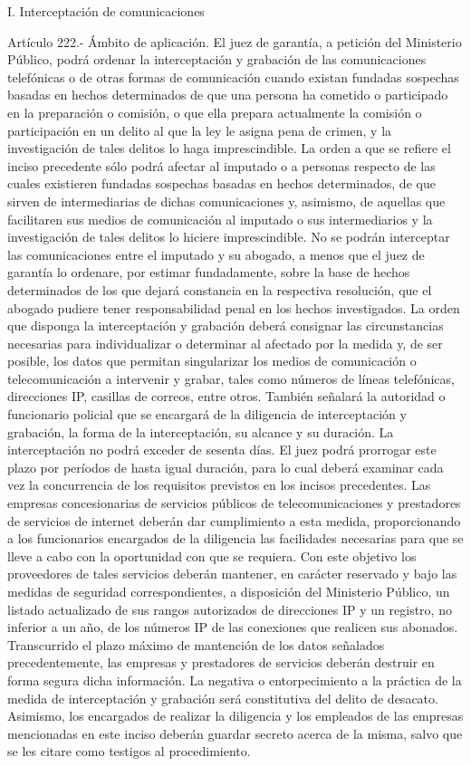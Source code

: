     I. Interceptación de comunicaciones


    Artículo 222.- Ámbito de aplicación. El juez de garantía, a petición del Ministerio Público, podrá ordenar la interceptación y grabación de las comunicaciones telefónicas o de otras formas de comunicación cuando existan fundadas sospechas basadas en hechos determinados de que una persona ha cometido o participado en la preparación o comisión, o que ella prepara actualmente la comisión o participación en un delito al que la ley le asigna pena de crimen, y la investigación de tales delitos lo haga imprescindible.
    La orden a que se refiere el inciso precedente sólo podrá afectar al imputado o a personas respecto de las cuales existieren fundadas sospechas basadas en hechos determinados, de que sirven de intermediarias de dichas comunicaciones y, asimismo, de aquellas que facilitaren sus medios de comunicación al imputado o sus intermediarios y la investigación de tales delitos lo hiciere imprescindible.
    No se podrán interceptar las comunicaciones entre el imputado y su abogado, a menos que el juez de garantía lo ordenare, por estimar fundadamente, sobre la base de hechos determinados de los que dejará constancia en la respectiva resolución, que el abogado pudiere tener responsabilidad penal en los hechos investigados.
    La orden que disponga la interceptación y grabación deberá consignar las circunstancias necesarias para individualizar o determinar al afectado por la medida y, de ser posible, los datos que permitan singularizar los medios de comunicación o telecomunicación a intervenir y grabar, tales como números de líneas telefónicas, direcciones IP, casillas de correos, entre otros. También señalará la autoridad o funcionario policial que se encargará de la diligencia de interceptación y grabación, la forma de la interceptación, su alcance y su duración.
    La interceptación no podrá exceder de sesenta días. El juez podrá prorrogar este plazo por períodos de hasta igual duración, para lo cual deberá examinar cada vez la concurrencia de los requisitos previstos en los incisos precedentes.
    Las empresas concesionarias de servicios públicos de telecomunicaciones y prestadores de servicios de internet deberán dar cumplimiento a esta medida, proporcionando a los funcionarios encargados de la diligencia las facilidades necesarias para que se lleve a cabo con la oportunidad con que se requiera. Con este objetivo los proveedores de tales servicios deberán mantener, en carácter reservado y bajo las medidas de seguridad correspondientes, a disposición del Ministerio Público, un listado actualizado de sus rangos autorizados de direcciones IP y un registro, no inferior a un año, de los números IP de las conexiones que realicen sus abonados. Transcurrido el plazo máximo de mantención de los datos señalados precedentemente, las empresas y prestadores de servicios deberán destruir en forma segura dicha información. La negativa o entorpecimiento a la práctica de la medida de interceptación y grabación será constitutiva del delito de desacato. Asimismo, los encargados de realizar la diligencia y los empleados de las empresas mencionadas en este inciso deberán guardar secreto acerca de la misma, salvo que se les citare como testigos al procedimiento.
